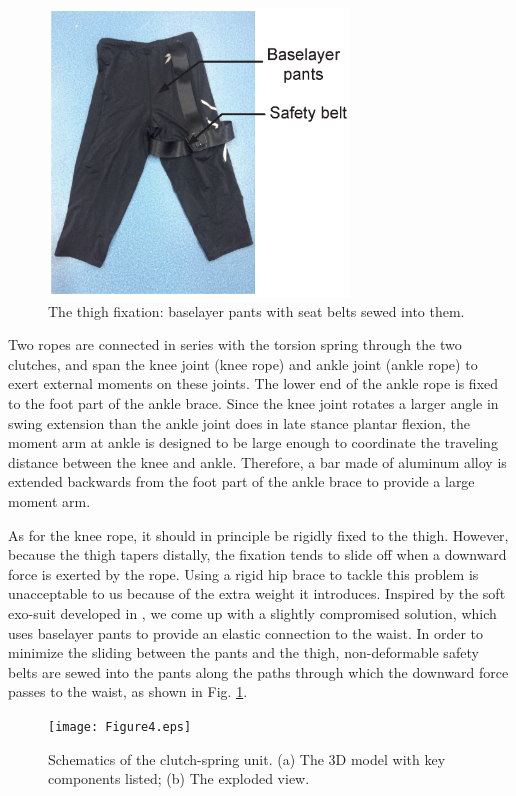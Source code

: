 \documentclass[twocolumn,cleanfoot,10pt]{asme2ej}
\begin{document}
\begin{figure}[b]
	\centering
	\includegraphics[width=8cm]{Figure3.eps}
	\caption{The thigh fixation: baselayer pants with seat belts sewed into them.}
	\label{fig:pants}   
\end{figure}

Two ropes are connected in series with the torsion spring through the two clutches, and span the knee joint (knee rope) and ankle joint (ankle rope) to exert external moments on these joints.
The lower end of the ankle rope is fixed to the foot part of the ankle brace.
Since the knee joint rotates a larger angle in swing extension than the ankle joint does in late stance plantar flexion, the moment arm at ankle is designed to be large enough to coordinate the traveling distance between the knee and ankle.
Therefore, a bar made of aluminum alloy is extended backwards from the foot part of the ankle brace to provide a large moment arm.

As for the knee rope, it should in principle be rigidly fixed to the thigh.
However, because the thigh tapers distally, the fixation tends to slide off when a downward force is exerted by the rope.
Using a rigid hip brace to tackle this problem is unacceptable to us because of the extra weight it introduces.
Inspired by the soft exo-suit developed in \cite{RN20}, we come up with a slightly compromised solution, which uses baselayer pants to provide an elastic connection to the waist.
In order to minimize the sliding between the pants and the thigh, non-deformable safety belts are sewed into the pants along the paths through which the downward force passes to the waist, as shown in Fig. \ref{fig:pants}.

\begin{figure}[t]
	\centering
	\texttt{[image: Figure4.eps]}
	\caption{Schematics of the clutch-spring unit. (a) The 3D model with key components listed; (b) The exploded view.}
	\label{fig:clutch}   
\end{figure}
\end{document}
